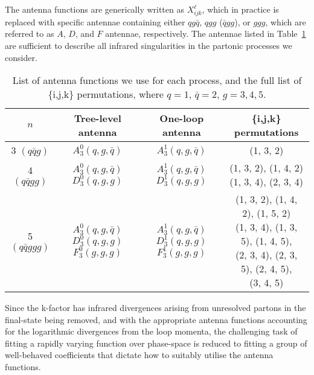 \documentclass[main.tex]{subfiles}
\begin{document}
The antenna functions are generically written as $X_{ijk}^{\ell}$,
which in practice is replaced with specific antennae containing either
$qg\bar{q}$, $qgg$ ($\bar{q}gg$), or $ggg$, which are
referred to as $A$, $D$, and $F$ antennae, respectively. The antennae
listed in Table~\ref{table:1L_antenna_functions} are sufficient to
describe all infrared singularities in the partonic
processes we consider.
\begin{table}
    \centering
    \begin{tabular}{cccc}
        \toprule
        $n$ & Tree-level antenna & One-loop antenna & {\{i,j,k\}} permutations \\
        \midrule
        3 $(q \bar{q} g)$     & $A_{3}^{0}(q, g, \bar{q})$ & $A_{3}^{1}(q, g, \bar{q})$  & (1, 3, 2) \\
        \midrule
        4 $(q \bar{q} g g)$   & \makecell{$A_{3}^{0}(q, g, \bar{q})$ \\ $D_{3}^{0}(q, g, g)$} & \makecell{$A_{3}^{1}(q, g, \bar{q})$ \\ $D_{3}^{1}(q, g, g)$} & \makecell{(1, 3, 2), (1, 4, 2) \\ (1, 3, 4), (2, 3, 4)} \\
        \midrule
        5 $(q \bar{q} g g g)$ & \makecell{$A_{3}^{0}(q, g, \bar{q})$ \\ $D_{3}^{0}(q, g, g)$ \\ $F_{3}^{0}(g, g, g)$} & \makecell{$A_{3}^{1}(q, g, \bar{q})$ \\ $D_{3}^{1}(q, g, g)$ \\ $F_{3}^{1}(g, g, g)$} & \makecell{(1, 3, 2), (1, 4, 2), (1, 5, 2) \\ (1, 3, 4), (1, 3, 5), (1, 4, 5), \\ (2, 3, 4), (2, 3, 5), (2, 4, 5), \\ (3, 4, 5)} \\
        \bottomrule
    \end{tabular}
    \caption{List of antenna functions we use for each process,
    and the full list of {\{i,j,k\}} permutations, where $q=1$,
    $\bar{q}=2$, $g=3,4,5$.}
    \label{table:1L_antenna_functions}
\end{table}

Since the k-factor has infrared divergences arising from
unresolved partons in the final-state being removed, and with
the appropriate antenna functions accounting for the
logarithmic divergences from the loop momenta, the
challenging task of fitting a rapidly varying function
over phase-space is reduced to fitting a group of
well-behaved coefficients that dictate how to suitably utilise
the antenna functions.
\end{document}
